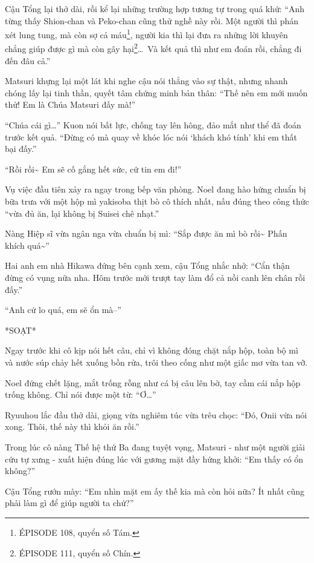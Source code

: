 \documentclass[../main.tex]{subfiles}
\begin{document}
Cậu Tổng lại thở dài, rồi kể lại những trường hợp tương tự trong quá khứ: ``Anh từng thấy Shion-chan và Peko-chan cũng thử nghề này rồi. Một người thì phán xét lung tung, mà còn sợ cả máu\footnote{{\flaregothic ÉPISODE 108}, quyển số Tám.}, người kia thì lại đưa ra những lời khuyên chẳng giúp được gì mà còn gây hại\footnote{{\flaregothic ÉPISODE 111}, quyển số Chín.}\dots\ Và kết quả thì như em đoán rồi, chẳng đi đến đâu cả.''

Matsuri khựng lại một lát khi nghe cậu nói thẳng vào sự thật, nhưng nhanh chóng lấy lại tinh thần, quyết tâm chứng minh bản thân: ``Thế nên em mới muốn thử! Em là Chúa Matsuri đấy mà!''

``Chúa cái gì\dots'' Kuon nói bất lực, chống tay lên hông, đảo mắt như thể đã đoán trước kết quả. ``Đừng có mà quay về khóc lóc nói `khách khó tính' khi em thất bại đấy.''

``Rồi rồi\~{} Em sẽ cố gắng hết sức, cứ tin em đi!''

\ct

Vụ việc đầu tiên xảy ra ngay trong bếp văn phòng. Noel đang hào hứng chuẩn bị bữa trưa với một hộp mì yakisoba thịt bò cô thích nhất, nấu đúng theo công thức ``vừa đủ ăn, lại không bị Suisei chê nhạt.''

Nàng Hiệp sĩ vừa ngân nga vừa chuẩn bị mì: ``Sắp được ăn mì bò rồi\~{} Phấn khích quá\~{}''

Hai anh em nhà Hikawa đứng bên cạnh xem, cậu Tổng nhắc nhở: ``Cẩn thận đừng có vụng nữa nha. Hôm trước mới trượt tay làm đổ cả nồi canh lên chân rồi đấy.''

``Anh cứ lo quá, em sẽ ổn mà--''

*SOẠT*

Ngay trước khi cô kịp nói hết câu, chỉ vì không đóng chặt nắp hộp, toàn bộ mì và nước súp chảy hết xuống bồn rửa, trôi theo cống như một giấc mơ vừa tan vỡ.


Noel đứng chết lặng, mắt trống rỗng như cá bị câu lên bờ, tay cầm cái nắp hộp trống không. Chỉ nói được một từ: ``Ơ\dots''

Ryuuhou lắc đầu thở dài, giọng vừa nghiêm túc vừa trêu chọc: ``Đó, Onii vừa nói xong. Thôi, thế này thì khỏi ăn rồi.''

Trong lúc cô nàng Thế hệ thứ Ba đang tuyệt vọng, Matsuri - như một người giải cứu tự xưng - xuất hiện đúng lúc với gương mặt đầy hứng khởi: ``Em thấy có ổn không?''

Cậu Tổng rướn mày: ``Em nhìn mặt em ấy thế kia mà còn hỏi nữa? Ít nhất cũng phải làm gì để giúp người ta chứ?''
\end{document}
